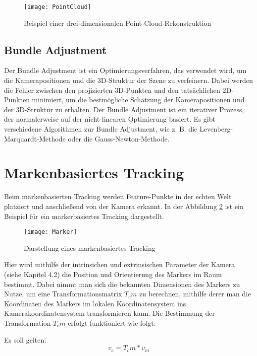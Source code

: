 \begin{figure}
    \centering
    \texttt{[image: PointCloud]}
    \caption{Beispiel einer drei-dimensionalen Point-Cloud-Rekonstruktion\label{fig:PointCloud}}\par
\end{figure}

\subsection{Bundle Adjustment}

Der Bundle Adjustment ist ein Optimierungsverfahren, das verwendet wird, um die Kamerapositionen und die 3D-Struktur der Szene zu verfeinern. Dabei werden die Fehler zwischen den projizierten 3D-Punkten und den tatsächlichen 2D-Punkten minimiert, um die bestmögliche Schätzung der Kamerapositionen und der 3D-Struktur zu erhalten. Der Bundle Adjustment ist ein iterativer Prozess, der normalerweise auf der nicht-linearen Optimierung basiert. Es gibt verschiedene Algorithmen zur Bundle Adjustment, wie z. B. die Levenberg-Marquardt-Methode oder die Gauss-Newton-Methode.

\section{Markenbasiertes Tracking}

Beim markenbasierten Tracking werden Feature-Punkte in der echten Welt platziert und anschließend von der Kamera erkannt. In der Abbildung \ref{fig:Marker} ist ein Beispiel für ein markerbasiertes Tracking dargestellt. 

\begin{figure}
    \centering
    \texttt{[image: Marker]}
    \caption{Darstellung eines markenbasiertes Tracking\label{fig:Marker}}\par
\end{figure}

Hier wird mithilfe der intrinsichen und extrinsischen Parameter der Kamera (siehe Kapitel 4.2) die Position und Orientierung des Markers im Raum bestimmt. Dabei nimmt man sich die bekannten Dimensionen des Markers zu Nutze, um eine Transformationsmatrix \(T_cm\) zu berechnen, mithilfe derer man die Koordinaten des Markers im lokalen Koordinatensystem ins Kamerakoordinatensystem transformieren kann. Die Bestimmung der Transformation \(T_cm\) erfolgt funktioniert wie folgt:

Es soll gelten:
\[ v_c = T_cm * v_m \]

